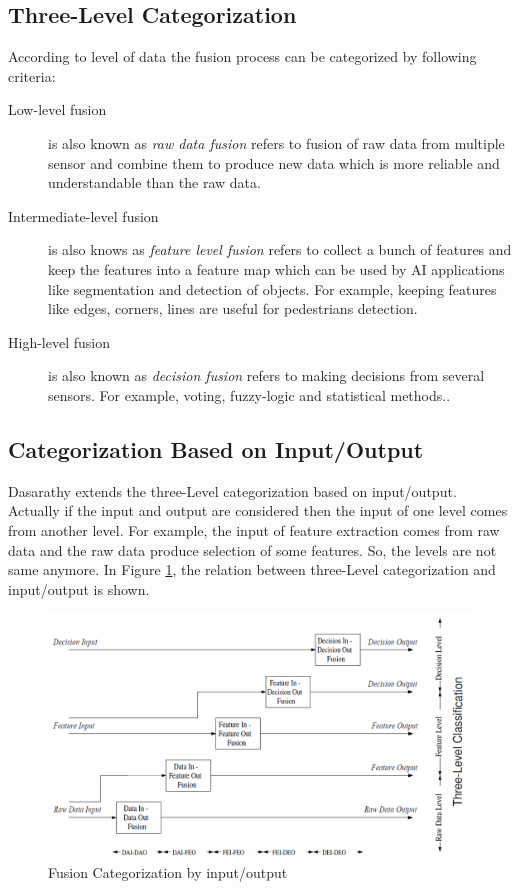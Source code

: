 \subsection{Three-Level Categorization}
According to level of data the fusion process can be categorized by following criteria:
\begin{description}
    \item[Low-level fusion] is also known as \emph{raw data fusion} refers to fusion of raw data from multiple sensor and combine them to produce new data which is more reliable and understandable than the raw data.
    \item[Intermediate-level fusion] is also knows as \emph{feature level fusion} refers to collect a bunch of features and keep the features into a feature map which can be used by AI applications like segmentation and detection of objects. For example, keeping features like edges, corners, lines are useful for pedestrians detection.
    \item[High-level fusion] is also known as \emph{decision fusion} refers to making decisions from several sensors. For example, voting, fuzzy-logic and statistical methods.\cite{Wilfried2002}.
\end{description}

\subsection{Categorization Based on Input/Output}
Dasarathy extends the three-Level categorization based on input/output\cite{Wilfried2002}. Actually if the input and output are considered then the input of one level comes from another level. For example, the input of feature extraction comes from raw data and the raw data produce selection of some features. So, the levels are not same anymore.  In Figure \ref{fig:InputoutputCat}, the relation between three-Level categorization and input/output is shown.
\begin{figure}
  \centering
  \includegraphics[width=1.1\textwidth]{src/pic/InputoutputCat.png}
  \caption{Fusion Categorization by input/output}
  \label{fig:InputoutputCat}
\end{figure}

